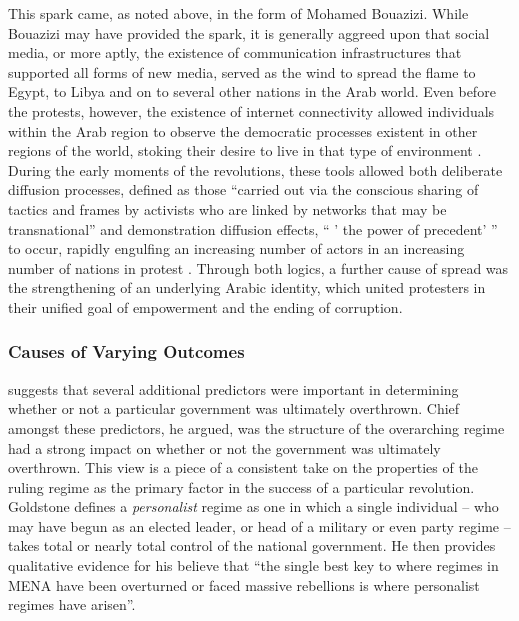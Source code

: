 This spark came, as noted above, in the form of Mohamed Bouazizi.  While Bouazizi may have provided the spark, it is generally aggreed upon that social media, or more aptly, the existence of communication infrastructures that supported all forms of new media\citep{wolfsfeld_social_2013,tufekci_social_2012}, served as the wind to spread the flame to Egypt, to Libya and on to several other nations in the Arab world.  Even before the protests, however, the existence of internet connectivity allowed individuals within the Arab region to observe the democratic processes existent in other regions of the world, stoking their desire to live in that type of environment \cite{hussain_what_2013}. During the early moments of the revolutions, these tools allowed both deliberate diffusion processes, defined as those ``carried out via the conscious sharing of tactics and frames by activists who are linked by networks that may be transnational'' and demonstration diffusion effects,  `` ' the power of precedent' '' to occur, rapidly engulfing an increasing number of actors in an increasing number of nations in protest \citep{}.  Through both logics, a further cause of spread was the strengthening of an underlying Arabic identity, which united protesters in their unified goal of empowerment and the ending of corruption. 
	
\subsubsection{Causes of Varying Outcomes}

\citeauthor{goldstone_bringing_2013} \citeyearpar{goldstone_bringing_2013} suggests that several additional predictors were important in determining whether or not a particular government was ultimately overthrown.  Chief amongst these predictors, he argued, was the structure of the overarching regime had a strong impact on whether or not the government was ultimately overthrown.  This view is a piece of a consistent take on  the properties of the ruling regime as the primary factor in the success of a particular revolution\cite{bellin_reconsidering_2012,comunello_will_2012,goldstone_bringing_2013}.  Goldstone defines a \emph{personalist} regime as one in which a single individual – who may have begun as an elected leader, or head of a military or even party regime – takes total or nearly total control of the national government. He then provides qualitative evidence for his believe that ``the single best key to where regimes in MENA have been overturned or faced massive rebellions is where personalist regimes have arisen''.

